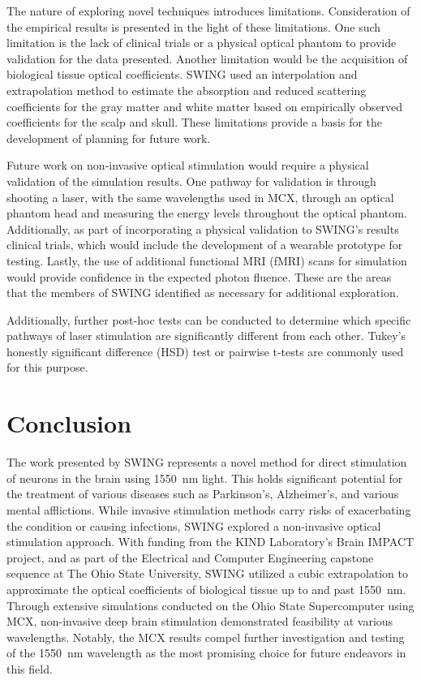 \documentclass[journal,twoside,web]{ieeecolor}
\begin{document}
The nature of exploring novel techniques introduces limitations. Consideration of the empirical results is presented in the light of these limitations. One such
limitation is the lack of clinical trials or a physical optical phantom to provide validation for the data presented. Another limitation would be the acquisition
of biological tissue optical coefficients. SWING used an interpolation and extrapolation method to estimate the absorption and reduced scattering coefficients for
the gray matter and white matter based on empirically observed coefficients\cite{b5} for the scalp and skull. These limitations provide a basis for the
development of planning for future work. 

Future work on non-invasive optical stimulation would require a physical validation of the simulation results. 
One pathway for validation is through shooting a laser, with the same wavelengths used in MCX, through an optical phantom head and 
measuring the energy levels throughout the optical phantom. Additionally, as part of incorporating a physical validation to SWING's results
clinical trials, which would include the development of a wearable prototype for testing. Lastly, the use of additional functional MRI (fMRI) scans
for simulation would provide confidence in the expected photon fluence. These are the areas that the members of SWING identified as necessary for 
additional exploration.

Additionally, further post-hoc tests can be conducted to determine which specific pathways of laser stimulation are significantly different from each other. Tukey's 
honestly significant difference (HSD) test or pairwise t-tests are commonly used for this purpose.



\section{Conclusion}
\label{sec:conclusion}
The work presented by SWING represents a novel method for direct stimulation of neurons in the brain using 1550~nm light. This holds significant potential 
for the treatment of various diseases such as Parkinson's, Alzheimer's, and various mental afflictions. 
While invasive stimulation methods carry risks of exacerbating the condition or causing infections, SWING explored a non-invasive optical stimulation approach. 
With funding from the KIND Laboratory's Brain IMPACT project, and as part of the Electrical and Computer Engineering capstone sequence at The Ohio State University, 
SWING utilized a cubic extrapolation to approximate the optical coefficients of biological tissue up to and past 1550~nm. Through extensive simulations conducted on 
the Ohio State Supercomputer using MCX, non-invasive deep brain stimulation demonstrated feasibility at various wavelengths. Notably, 
the MCX results compel further investigation and testing of the 1550~nm wavelength as the most promising choice for future endeavors in this field. 
\end{document}
